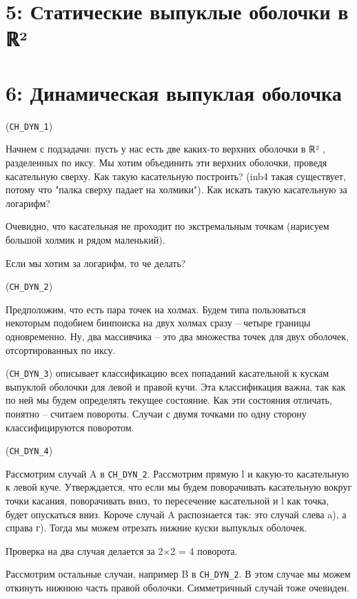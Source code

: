 \documentclass[11pt]{article}
\begin{document}
\section{{\bfseries{}} 5:  Статические выпуклые оболочки в ℝ²}
\label{sec-6}
\section{{\bfseries{}} 6:  Динамическая выпуклая оболочка}
\label{sec-7}
(\verb~CH_DYN_1~)

Начнем с подзадачи: пусть у нас есть две каких-то верхних оболочки в
ℝ² , разделенных по иксу. Мы хотим объединить эти верхних оболочки,
проведя касательную сверху. Как такую касательную построить? (inb4
такая существует, потому что "палка сверху падает на холмики"). Как
искать такую касательную за логарифм?

Очевидно, что касательная не проходит по экстремальным точкам
(нарисуем большой холмик и рядом маленький).

Если мы хотим за логарифм, то че делать?

(\verb~CH_DYN_2~)

Предположим, что есть пара точек на холмах. Будем типа пользоваться
некоторым подобием бинпоиска на двух холмах сразу -- четыре границы
одновременно. Ну, два массивчика -- это два множества точек для двух
оболочек, отсортированных по иксу.

(\verb~CH_DYN_3~) описывает классификацию всех попаданий касательной к кускам
выпуклой оболочки для левой и правой кучи. Эта классификация важна,
так как по ней мы будем определять текущее состояние. Как эти
состояния отличать, понятно -- считаем повороты. Случаи с двумя
точками по одну сторону классифицируются поворотом.

(\verb~CH_DYN_4~)

Рассмотрим случай A в \verb~CH_DYN_2~. Рассмотрим прямую l и какую-то
касательную к левой куче. Утверждается, что если мы будем
поворачивать касательную вокруг точки касания, поворачивать вниз, то
пересечение касательной и l как точка, будет опускаться вниз.
Короче случай A распознается так: это случай слева a), а справа
г). Тогда мы можем отрезать нижние куски выпуклых оболочек.

Проверка на два случая делается за 2×2 = 4 поворота.

Рассмотрим остальные случаи, например B в \verb~CH_DYN_2~. В этом случае мы
можем откинуть нижнюю часть правой оболочки. Симметричный случай
тоже очевиден.
\end{document}
